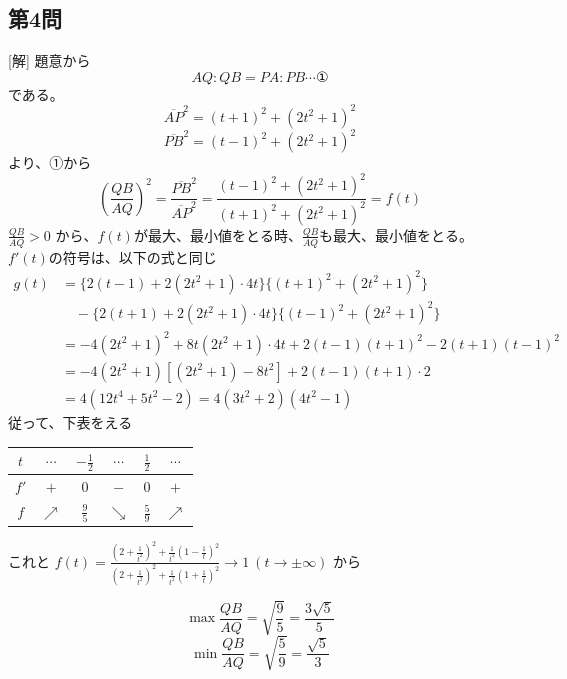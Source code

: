 \documentclass[../main.tex]{subfiles}
\begin{document}
\subsection*{第4問}
[解] 題意から
$$AQ : QB = PA : PB \cdots \text{①}$$
である。
$$\overline{AP}^2 = (t+1)^2 + (2t^2+1)^2$$
$$\overline{PB}^2 = (t-1)^2 + (2t^2+1)^2$$
より、①から
$$\left(\frac{QB}{AQ}\right)^2 = \frac{\overline{PB}^2}{\overline{AP}^2} = \frac{(t-1)^2 + (2t^2+1)^2}{(t+1)^2 + (2t^2+1)^2} = f(t)$$
$\frac{QB}{AQ} > 0$ から、$f(t)$が最大、最小値をとる時、$\frac{QB}{AQ}$も最大、最小値をとる。\\
$f'(t)$の符号は、以下の式と同じ
\begin{align*}
  g(t) &= \{2(t-1) + 2(2t^2+1) \cdot 4t\}\{(t+1)^2 + (2t^2+1)^2\} \\
  &\quad - \{2(t+1) + 2(2t^2+1) \cdot 4t\}\{(t-1)^2 + (2t^2+1)^2\} \\
  &= -4(2t^2+1)^2 + 8t(2t^2+1) \cdot 4t + 2(t-1)(t+1)^2 - 2(t+1)(t-1)^2 \\
  &= -4(2t^2+1) [ (2t^2+1) - 8t^2 ] + 2(t-1)(t+1) \cdot 2 \\
  &= 4( 12t^4 + 5t^2 - 2 ) = 4(3t^2+2)(4t^2-1)
\end{align*}
従って、下表をえる

\begin{center}
  \begin{tabular}{|c|c|c|c|c|c|}
    \hline
    $t$ & $\cdots$ & $-\frac{1}{2}$ & $\cdots$ & $\frac{1}{2}$ & $\cdots$ \\
    \hline
    $f'$ & $+$ & $0$ & $-$ & $0$ & $+$ \\
    \hline
    $f$ & $\nearrow$ & $\frac{9}{5}$ & $\searrow$ & $\frac{5}{9}$ & $\nearrow$ \\
    \hline
  \end{tabular}
\end{center}

これと $f(t) = \frac{\left(2 + \frac{1}{t^2}\right)^2 + \frac{1}{t^2} \left(1 - \frac{1}{t}\right)^2}{\left(2 + \frac{1}{t^2}\right)^2 + \frac{1}{t^2} \left(1 + \frac{1}{t}\right)^2} \to 1 \ (t \to \pm\infty)$ から

$$\max \frac{QB}{AQ} = \sqrt{\frac{9}{5}} = \frac{3\sqrt{5}}{5}$$
$$\min \frac{QB}{AQ} = \sqrt{\frac{5}{9}} = \frac{\sqrt{5}}{3}$$

\vspace{1em}
\vspace{1em}
\end{document}
